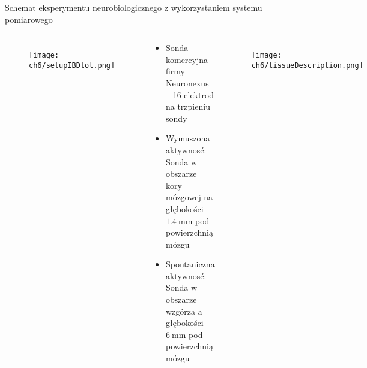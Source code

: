 \begin{frame}{Schemat eksperymentu neurobiologicznego z wykorzystaniem systemu pomiarowego}
    \begin{columns}



        \begin{figure}[H]
            \centering 
            \texttt{[image: ch6/setupIBDtot.png]}  
        \end{figure}

        \vspace{-1em}

        \begin{block}{}

            \begin{itemize}
                \item Sonda komercyjna firmy Neuronexus -- 16 elektrod na trzpieniu sondy
                \item Wymuszona aktywnosć: Sonda w obszarze kory mózgowej na głębokości $\SI{1.4}{\milli\metre}$ pod powierzchnią mózgu
                \item Spontaniczna aktywnosć: Sonda w obszarze wzgórza a głębokości $\SI{6}{\milli\metre}$ pod powierzchnią mózgu


            \end{itemize}
        \end{block}
            \vspace{-1em}

            \begin{figure}[H]
                \centering 
                \texttt{[image: ch6/tissueDescription.png]}  
            \end{figure}




    \end{columns}

\end{frame}

   
   

